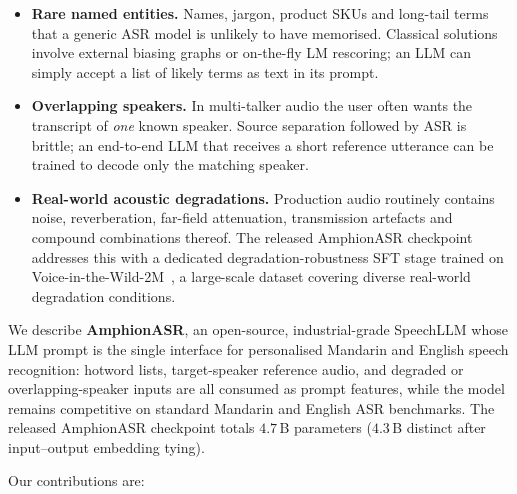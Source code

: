 \begin{itemize}
  \item \textbf{Rare named entities.} Names, jargon, product SKUs and
        long-tail terms that a generic ASR model is unlikely to have
        memorised. Classical solutions involve external biasing
        graphs or on-the-fly LM rescoring; an LLM can simply accept a
        list of likely terms as text in its prompt.
  \item \textbf{Overlapping speakers.} In multi-talker audio the user
        often wants the transcript of \emph{one} known speaker. Source
        separation followed by ASR is brittle; an end-to-end LLM that
        receives a short reference utterance can be trained to decode
        only the matching speaker.
  \item \textbf{Real-world acoustic degradations.}
        Production audio routinely contains noise, reverberation,
        far-field attenuation, transmission artefacts and compound
        combinations thereof. The released AmphionASR checkpoint
        addresses this with a dedicated degradation-robustness SFT
        stage trained on Voice-in-the-Wild-2M~\cite{xie2026mega}, a large-scale dataset
        covering diverse real-world degradation conditions.
\end{itemize}

We describe \textbf{AmphionASR}, an open-source, industrial-grade
SpeechLLM whose LLM prompt is the single interface for personalised
Mandarin and English speech recognition: hotword lists,
target-speaker reference audio, and degraded or overlapping-speaker
inputs are all consumed as prompt features, while the model remains
competitive on standard Mandarin and English ASR benchmarks. The
released AmphionASR checkpoint totals $4.7$\,B parameters
($4.3$\,B distinct after input--output embedding tying).

Our contributions are:

